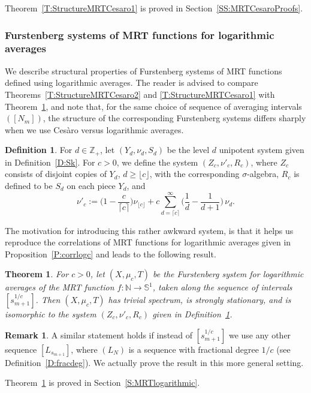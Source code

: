 \documentclass[11pt]{amsart}
\newtheorem{theorem}[lemma]{Theorem}
\theoremstyle{definition}
\newtheorem{definition}{Definition}[section]
\newtheorem*{remark}{Remark}
\newcommand{\N}{{\mathbb N}}
\renewcommand{\S}{\mathbb{S}}
\newcommand{\Z}{{\mathbb Z}}
\begin{document}
Theorem~\ref{T:StructureMRTCesaro1} is proved in Section~\ref{SS:MRTCesaroProofs}.

\subsubsection{Furstenberg systems of MRT functions for logarithmic averages}
We describe structural properties of  Furstenberg systems of MRT functions defined using logarithmic averages. The reader is advised to compare   Theorems~\ref{T:StructureMRTCesaro2} and \ref{T:StructureMRTCesaro1} with  Theorem~\ref{T:StructureMRTLogarithmic}, and note that,  for the same choice of sequence of averaging intervals $([N_m])$, the  structure of the corresponding Furstenberg systems differs sharply when we use   Ces\`aro versus logarithmic averages.
  \begin{definition}\label{D:muc}
	For $d\in \Z_+$, let $(Y_d,\nu_d,S_d)$
be the level $d$ unipotent system given in  Definition~\ref{D:Sk}.	
	For $c>0$, we  define the system
	$(Z_c,\nu'_c, R_c)$, where $Z_c$ consists of disjoint copies of $Y_d$, $d\geq \lfloor c\rfloor$,
	with the corresponding $\sigma$-algebra, $R_c$ is defined to be $S_d$
	on each piece $Y_d$,
	and
	$$
	\nu'_c:=\Big(1-\frac{c}{\lceil c\rceil}\Big) \nu_{\lfloor c\rfloor }  + c\sum_{d=\lceil c\rceil}^\infty
	\Big(\frac{1}{d}-\frac{1}{d+1}\Big)\, \nu_d.
	$$
\end{definition}
The motivation for introducing this rather awkward system, is that it helps us reproduce the correlations of MRT functions for logarithmic averages  given in Proposition~\ref{P:corrlogc} and leads to the following result.
	 \begin{theorem}\label{T:StructureMRTLogarithmic}
	For $c>0$, let $(X,\mu_c,T)$ be the  Furstenberg system for logarithmic averages of the MRT function  $f\colon \N\to \S^1$, taken  along the sequence of intervals $[s_{m+1}^{1/c}]$. Then $(X,\mu_c,T)$  has trivial spectrum, is strongly stationary,  and is  isomorphic to    the system  $(Z_c,\nu'_c ,R_c)$ given in  Definition~\ref{D:muc}.
\end{theorem}
\begin{remark}
	A similar statement holds if instead of  $[s_{m+1}^{1/c}]$ we use  any other sequence $[L_{s_{m+1}}]$, where $(L_N)$ is a sequence with fractional degree  $1/c$
	(see Definition~\ref{D:fracdeg}). We actually prove the result in this more general setting.
\end{remark}
Theorem~\ref{T:StructureMRTLogarithmic} is proved in Section~\ref{S:MRTlogarithmic}.
\end{document}
